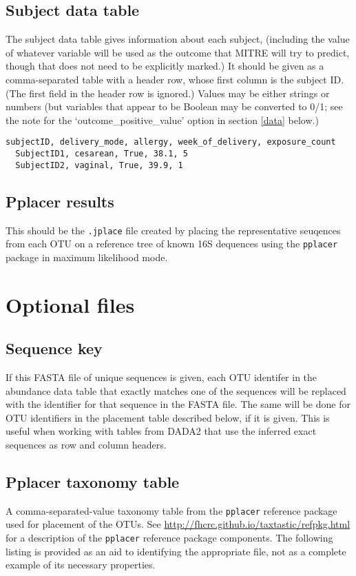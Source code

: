 \documentclass[12pt]{report}
\begin{document}
\subsection{Subject data table}\label{subject_data}
The subject data table gives information about each subject,
(including the value of whatever variable will be used as the outcome
that MITRE will try to predict, though that does not need to be
explicitly marked.) It should be given as a comma-separated table with
a header row, whose first column is the subject ID. (The first field
in the header row is ignored.) Values may be either strings or numbers
(but variables that appear to be Boolean may be converted to 0/1; see
the note for the `outcome\_positive\_value' option in section
\ref{data} below.)
\begin{lstlisting}[caption=Example subject data table]
  subjectID, delivery_mode, allergy, week_of_delivery, exposure_count
  SubjectID1, cesarean, True, 38.1, 5
  SubjectID2, vaginal, True, 39.9, 1
\end{lstlisting}

\subsection{Pplacer results}\label{jplace_file}
This should be the \texttt{.jplace} file created by placing the
representative seuqences from each OTU on a reference tree of known
16S dequences using the \texttt{pplacer} package in maximum likelihood
mode.

\section{Optional files}
\subsection{Sequence key}\label{sequence_key}
If this FASTA file of unique sequences is given, each OTU identifer in
the abundance data table that exactly matches one of the sequences
will be replaced with the identifier for that sequence in the FASTA
file. The same will be done for OTU identifiers in the placement table
described below, if it is given. This is useful when working with
tables from DADA2 that use the inferred exact sequences as
row and column headers.

\subsection{Pplacer taxonomy table}\label{pplacer_taxa_table}
A comma-separated-value taxonomy table from the \texttt{pplacer}
reference package used for placement of the OTUs. See
\url{http://fhcrc.github.io/taxtastic/refpkg.html} for a description
of the \texttt{pplacer} reference package components. The following
listing is provided as an aid to identifying the appropriate file, not
as a complete example of its necessary properties. 
\end{document}
